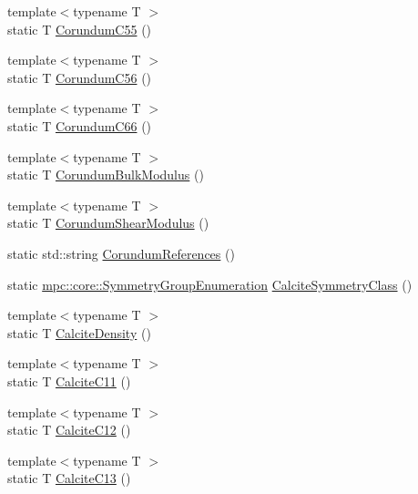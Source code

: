\begin{DoxyCompactItemize}
\item 
{\footnotesize template$<$typename T $>$ }\\static T \mbox{\hyperlink{namespacempc_1_1data_aafb798ca906c5052bcfc8e86bf39ecad}{Corundum\+C55}} ()
\item 
{\footnotesize template$<$typename T $>$ }\\static T \mbox{\hyperlink{namespacempc_1_1data_a21181a8c6bcce00d0f4e0db508eecdd1}{Corundum\+C56}} ()
\item 
{\footnotesize template$<$typename T $>$ }\\static T \mbox{\hyperlink{namespacempc_1_1data_a29162dbfd0a5419602cd6847cc8e8d90}{Corundum\+C66}} ()
\item 
{\footnotesize template$<$typename T $>$ }\\static T \mbox{\hyperlink{namespacempc_1_1data_aeacfe6ea0b7b07ccedac4127c7b3c624}{Corundum\+Bulk\+Modulus}} ()
\item 
{\footnotesize template$<$typename T $>$ }\\static T \mbox{\hyperlink{namespacempc_1_1data_ae7092346af51207cabe2991b51981fcb}{Corundum\+Shear\+Modulus}} ()
\item 
static std\+::string \mbox{\hyperlink{namespacempc_1_1data_acedbe3045d8f2a9cd517807f47674c9d}{Corundum\+References}} ()
\item 
static \mbox{\hyperlink{namespacempc_1_1core_a9d979684062547055a0ef5c13077bad8}{mpc\+::core\+::\+Symmetry\+Group\+Enumeration}} \mbox{\hyperlink{namespacempc_1_1data_ae9e7dd0d5810355b4e3f4127bead6bc1}{Calcite\+Symmetry\+Class}} ()
\item 
{\footnotesize template$<$typename T $>$ }\\static T \mbox{\hyperlink{namespacempc_1_1data_aacf62e708ec7949c2e75003526476456}{Calcite\+Density}} ()
\item 
{\footnotesize template$<$typename T $>$ }\\static T \mbox{\hyperlink{namespacempc_1_1data_a6113b36cf32d3a6a6646ebe81d20ba1c}{Calcite\+C11}} ()
\item 
{\footnotesize template$<$typename T $>$ }\\static T \mbox{\hyperlink{namespacempc_1_1data_a97de8f7514c9bad86546d5ce36b72a16}{Calcite\+C12}} ()
\item 
{\footnotesize template$<$typename T $>$ }\\static T \mbox{\hyperlink{namespacempc_1_1data_a13c90af5b73d7f9882e12b757a599e73}{Calcite\+C13}} ()
\item 

\end{DoxyCompactItemize}
